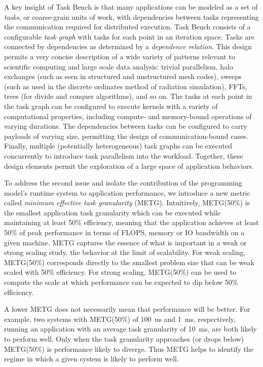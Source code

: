 A key insight of Task Bench is that many applications can be modeled
as a set of \emph{tasks}, or coarse-grain units of work, with
dependencies between tasks representing the communication required for
distributed execution. Task Bench consists of a configurable \emph{task graph} with tasks for
each point in an iteration space. Tasks are connected by dependencies
as determined by a \emph{dependence relation}. This design permits a
very concise description of a wide variety of patterns relevant to
scientific computing and large scale data analysis: trivial parallelism, halo exchanges (such as
seen in structured and unstructured mesh codes), sweeps (such as used
in the discrete ordinates method of radiation simulation), FFTs, trees
(for divide and conquer algorithms), and so on. The tasks at each
point in the task graph can be configured to execute kernels with a
variety of computational properties, including compute- and
memory-bound operations of varying durations. The dependencies between
tasks can be configured to carry payloads of varying size, permitting
the design of communication-bound cases. Finally, multiple
(potentially heterogeneous) task graphs can be executed concurrently
to introduce task parallelism into the workload. Together, these
design elements permit the exploration of a large space of application
behaviors.

To address the second issue and isolate the contribution of the programming model's runtime system
to application performance, we introduce a new metric called
\emph{minimum effective task granularity} (METG). Intuitively,
METG(50\%) is the smallest application task granularity which can be
executed while maintaining at least 50\% efficiency,
meaning that the application achieves at least 50\% of peak
performance in terms of FLOPS, memory or IO bandwidth 
on a given machine. METG captures the essence of what is important in a weak
or strong scaling study, the behavior at the limit of scalability. For
weak scaling, METG(50\%) corresponds directly to the smallest problem
size that can be weak scaled with 50\% efficiency. For strong scaling,
METG(50\%) can be used to compute the scale at which performance can
be expected to dip below 50\% efficiency.

A lower METG does not necessarily mean that performance will be
better. For example, two systems with METG(50\%) of 100~us and 1~ms,
respectively, running an application with an average task granularity
of 10~ms, are both likely to perform well. Only when the task
granularity approaches (or drops below) METG(50\%) is performance
likely to diverge. Thus METG helps to identify the regime in which a
given system is likely to perform well.


